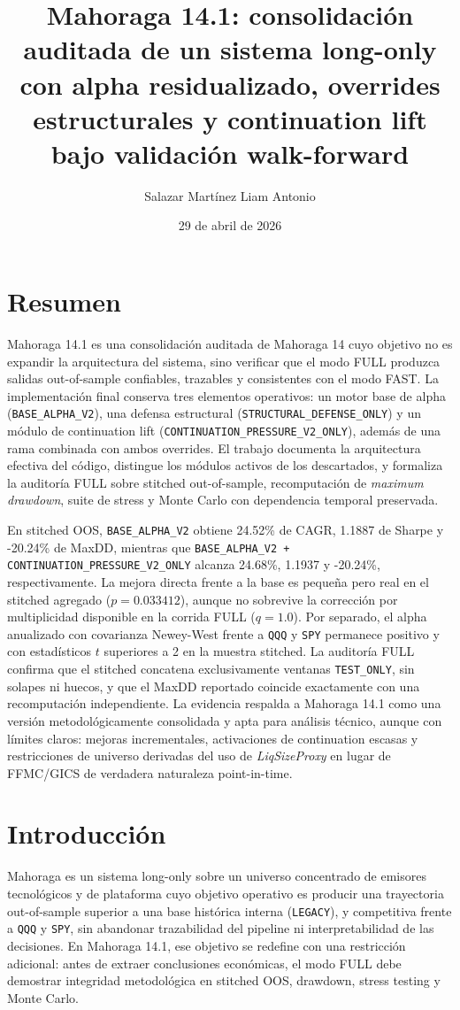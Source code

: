 \documentclass[11pt]{article}
\title{Mahoraga 14.1: consolidaci\'on auditada de un sistema long-only con alpha residualizado, overrides estructurales y continuation lift bajo validaci\'on walk-forward}
\author{Salazar Mart\'inez Liam Antonio}
\date{29 de abril de 2026}
\begin{document}
\maketitle

\section*{Resumen}
Mahoraga 14.1 es una consolidaci\'on auditada de Mahoraga 14 cuyo objetivo no es expandir la arquitectura del sistema, sino verificar que el modo FULL produzca salidas out-of-sample confiables, trazables y consistentes con el modo FAST. La implementaci\'on final conserva tres elementos operativos: un motor base de alpha (\texttt{BASE\_ALPHA\_V2}), una defensa estructural (\texttt{STRUCTURAL\_DEFENSE\_ONLY}) y un m\'odulo de continuation lift (\texttt{CONTINUATION\_PRESSURE\_V2\_ONLY}), adem\'as de una rama combinada con ambos overrides. El trabajo documenta la arquitectura efectiva del c\'odigo, distingue los m\'odulos activos de los descartados, y formaliza la auditor\'ia FULL sobre stitched out-of-sample, recomputaci\'on de \textit{maximum drawdown}, suite de stress y Monte Carlo con dependencia temporal preservada.

En stitched OOS, \texttt{BASE\_ALPHA\_V2} obtiene 24.52\% de CAGR, 1.1887 de Sharpe y -20.24\% de MaxDD, mientras que \texttt{BASE\_ALPHA\_V2 + CONTINUATION\_PRESSURE\_V2\_ONLY} alcanza 24.68\%, 1.1937 y -20.24\%, respectivamente. La mejora directa frente a la base es peque\~na pero real en el stitched agregado ($p=0.033412$), aunque no sobrevive la correcci\'on por multiplicidad disponible en la corrida FULL ($q=1.0$). Por separado, el alpha anualizado con covarianza Newey-West frente a \texttt{QQQ} y \texttt{SPY} permanece positivo y con estad\'isticos $t$ superiores a 2 en la muestra stitched. La auditor\'ia FULL confirma que el stitched concatena exclusivamente ventanas \texttt{TEST\_ONLY}, sin solapes ni huecos, y que el MaxDD reportado coincide exactamente con una recomputaci\'on independiente. La evidencia respalda a Mahoraga 14.1 como una versi\'on metodol\'ogicamente consolidada y apta para an\'alisis t\'ecnico, aunque con l\'imites claros: mejoras incrementales, activaciones de continuation escasas y restricciones de universo derivadas del uso de \textit{LiqSizeProxy} en lugar de FFMC/GICS de verdadera naturaleza point-in-time.

\section{Introducci\'on}
Mahoraga es un sistema long-only sobre un universo concentrado de emisores tecnol\'ogicos y de plataforma cuyo objetivo operativo es producir una trayectoria out-of-sample superior a una base hist\'orica interna (\texttt{LEGACY}), y competitiva frente a \texttt{QQQ} y \texttt{SPY}, sin abandonar trazabilidad del pipeline ni interpretabilidad de las decisiones. En Mahoraga 14.1, ese objetivo se redefine con una restricci\'on adicional: antes de extraer conclusiones econ\'omicas, el modo FULL debe demostrar integridad metodol\'ogica en stitched OOS, drawdown, stress testing y Monte Carlo.
\end{document}
